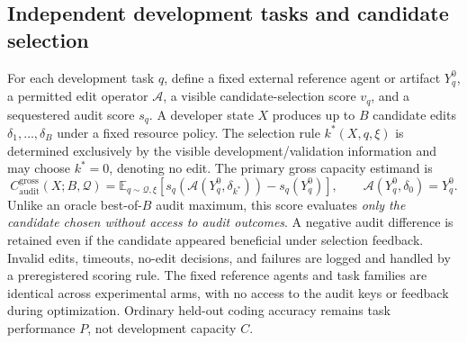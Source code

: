 \documentclass[11pt,a4paper]{article}
\begin{document}
\subsection{Independent development tasks and candidate selection}
For each development task \(q\), define a fixed external reference agent or artifact \(Y_q^0\), a permitted edit operator \(\mathcal A\), a visible candidate-selection score \(v_q\), and a sequestered audit score \(s_q\). A developer state \(X\) produces up to \(B\) candidate edits \(\delta_1,\ldots,\delta_B\) under a fixed resource policy. The selection rule \(k^*(X,q,\xi)\) is determined exclusively by the visible development/validation information and may choose \(k^*=0\), denoting no edit. The primary gross capacity estimand is
\begin{equation}
C_{\mathrm{audit}}^{\mathrm{gross}}(X;B,\mathcal Q)=\mathbb E_{q\sim\mathcal Q,\xi}\left[s_q\!\left(\mathcal A(Y_q^0,\delta_{k^*})\right)-s_q(Y_q^0)\right],\qquad \mathcal A(Y_q^0,\delta_0)=Y_q^0.
\label{eq:realanchor}
\end{equation}
Unlike an oracle best-of-\(B\) audit maximum, this score evaluates \emph{only the candidate chosen without access to audit outcomes}. A negative audit difference is retained even if the candidate appeared beneficial under selection feedback. Invalid edits, timeouts, no-edit decisions, and failures are logged and handled by a preregistered scoring rule. The fixed reference agents and task families are identical across experimental arms, with no access to the audit keys or feedback during optimization. Ordinary held-out coding accuracy remains task performance \(P\), not development capacity \(C\).
\end{document}
